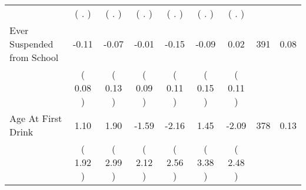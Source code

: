 \begin{tabular}{lcccccccc}
 & (        . ) & (        . ) & (        . ) & (        . ) & (        . ) & (        . ) & \\
Ever Suspended from School &     -0.11 &     -0.07 &     -0.01 &     -0.15 &     -0.09 &      0.02 & 391 &       0.08 \\ 
 & (     0.08 ) & (     0.13 ) & (     0.09 ) & (     0.11 ) & (     0.15 ) & (     0.11 ) & \\
Age At First Drink &      1.10 &      1.90 &     -1.59 &     -2.16 &      1.45 &     -2.09 & 378 &       0.13 \\ 
 & (     1.92 ) & (     2.99 ) & (     2.12 ) & (     2.56 ) & (     3.38 ) & (     2.48 ) & \\
\bottomrule
\end{tabular}
